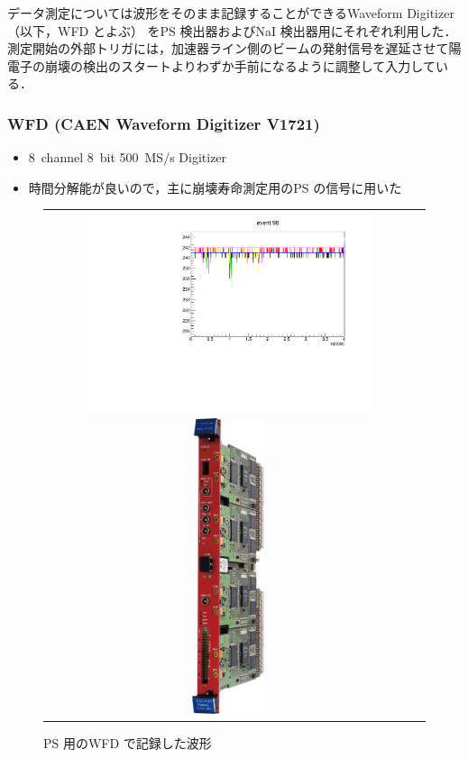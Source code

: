 データ測定については波形をそのまま記録することができるWaveform Digitizer （以下，WFD とよぶ） をPS 検出器およびNaI 検出器用にそれぞれ利用した．測定開始の外部トリガには，加速器ライン側のビームの発射信号を遅延させて陽電子の崩壊の検出のスタートよりわずか手前になるように調整して入力している．

\subsubsection{WFD (CAEN Waveform Digitizer V1721)}
\begin{itemize}
\item 8~channel 8~bit 500~MS/s Digitizer
\item 時間分解能が良いので，主に崩壊寿命測定用のPS の信号に用いた
\end{itemize}
\begin{figure}[H]
\begin{tabular}{cc}
\begin{minipage}{0.5\hsize}
\centering
\includegraphics[width=0.8\textwidth,angle=-90]{figure/hayakawa/ps_plot.pdf}
\caption{PS 用のWFD で記録した波形}
\end{minipage}
\begin{minipage}{0.4\hsize}
\centering
\includegraphics[width=0.2\textwidth]{figure/hayakawa/1095_L.jpg}
\end{minipage}
\end{tabular}
\end{figure}

